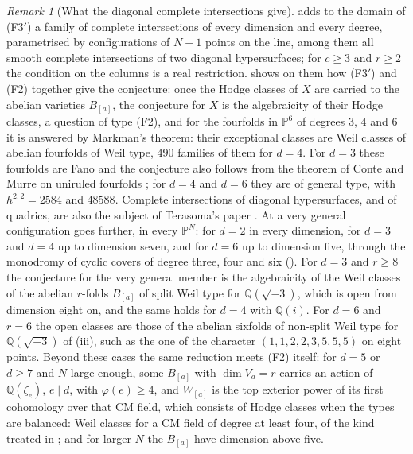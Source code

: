 \documentclass[11pt,reqno]{amsart}
\theoremstyle{plain}
\theoremstyle{definition}
\theoremstyle{remark}
\newtheorem{remark}[theorem]{Remark}
\newcommand{\QQ}{\mathbb{Q}}
\newcommand{\PP}{\mathbb{P}}
\begin{document}
\begin{remark}[What the diagonal complete intersections give]
\label{rem:vandermonde}
 adds to the domain of \textup{(F3$'$)} a family of
complete intersections of every dimension and every degree, parametrised by
configurations of $N+1$ points on the line, among them all smooth complete intersections of two diagonal
hypersurfaces; for $c\ge3$ and $r\ge2$ the condition on the columns is a real
restriction.  shows on them how \textup{(F3$'$)} and
(F2) together give the conjecture: once the Hodge classes of $X$ are
carried to the abelian varieties $B_{[a]}$, the conjecture for $X$ is the
algebraicity of their Hodge classes, a question of type (F2), and for the
fourfolds in $\PP^{6}$ of degrees $3$, $4$ and $6$ it is answered by
Markman's theorem: their exceptional classes are Weil classes of abelian
fourfolds of Weil type, $490$ families of them for $d=4$. For $d=3$ these
fourfolds are Fano and the conjecture also follows from the theorem of Conte
and Murre on uniruled fourfolds \cite{CM78}; for $d=4$ and $d=6$ they are of
general type, with $h^{2,2}=2584$ and $48588$. Complete intersections of
diagonal hypersurfaces, and of quadrics, are also the subject of Terasoma's
paper \cite{Ter88}. At a very general configuration
 goes further, in every $\PP^{N}$: for $d=2$ in every
dimension, for $d=3$ and $d=4$ up to dimension seven, and for $d=6$ up to
dimension five, through the monodromy of cyclic covers of degree three, four
and six (). For $d=3$ and $r\ge8$ the
conjecture for the very general member is the algebraicity of the Weil
classes of the abelian $r$-folds $B_{[a]}$ of split Weil type for
$\QQ(\sqrt{-3})$, which is open from dimension eight on, and the same holds
for $d=4$ with $\QQ(i)$. For $d=6$ and $r=6$ the open classes are those of
the abelian sixfolds of non-split Weil type for $\QQ(\sqrt{-3})$ of
(iii), such as the one of the character
$(1,1,2,2,3,5,5,5)$ on eight points. Beyond these cases the
same reduction meets (F2) itself: for $d=5$ or $d\ge7$ and $N$ large enough, some
$B_{[a]}$ with $\dim V_{a}=r$ carries an action of $\QQ(\zeta_{e})$, $e\mid d$,
with $\varphi(e)\ge4$, and $W_{[a]}$ is the top exterior power of its first
cohomology over that CM field, which consists of Hodge classes when the
types are balanced: Weil classes for a CM field of degree at least four, of
the kind treated in \cite[Theorem~1.1]{paperI}; and for larger $N$ the $B_{[a]}$ have
dimension above five.
\end{remark}
\end{document}
